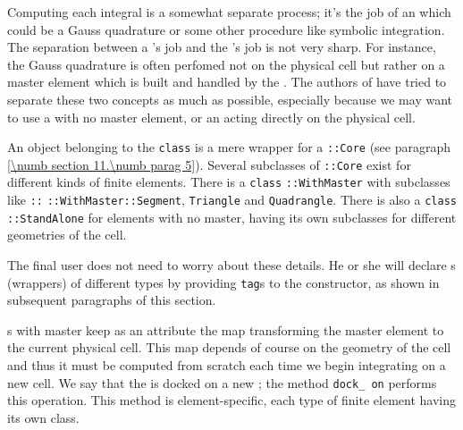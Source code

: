 Computing each integral is a somewhat separate process; it's the job of an
{\small\tt{}}
which could be a Gauss quadrature or some other procedure like symbolic integration.
The separation between a {\small\tt{}}'s job and
the {\small\tt{}}'s job is not very sharp.
For instance, the Gauss quadrature is often perfomed not on the physical cell but rather
on a master element which is built and handled by the {\small\tt{}}.
The authors of {\maniFEM} have tried to separate these two concepts
as much as possible, especially because we may want to use a {\small\tt{}}
with no master element, or an {\small\tt{}} acting directly on the physical cell.

An object belonging to the {\small\tt class} {\small\tt{}} is a mere wrapper
for a {\small\tt{}::Core} (see paragraph \ref{\numb section 11.\numb parag 5}).
Several subclasses of {\small\tt{}::Core} exist for different
kinds of finite elements.
There is a {\small\tt class} {\small\tt{}::WithMaster} with subclasses like
{\small\tt{}::} {\small\tt::WithMaster::Segment}, {\small\tt Triangle} and
{\small\tt Quadrangle}.
There is also a {\small\tt class} {\small\tt{}::StandAlone} for elements
with no master, having its own subclasses for different geometries of the cell.

The final user does not need to worry about these details.
He or she will declare {\small\tt{}}s (wrappers) of different types
by providing {\small\tt\textcolor{tag}{tag}}s to the constructor, as shown in
subsequent paragraphs of this section.

{\small\tt{}}s with master keep as an attribute the map transforming
the master element to the current physical cell.
This map depends of course on the geometry of the cell and thus it must be computed from
scratch each time we begin integrating on a new cell.
We say that the {\small\tt{}} is docked on a new {\small\tt{}};
the method {\small\tt dock\_\,on} performs this operation.
This method is element-specific, each type of finite element having its own class.

